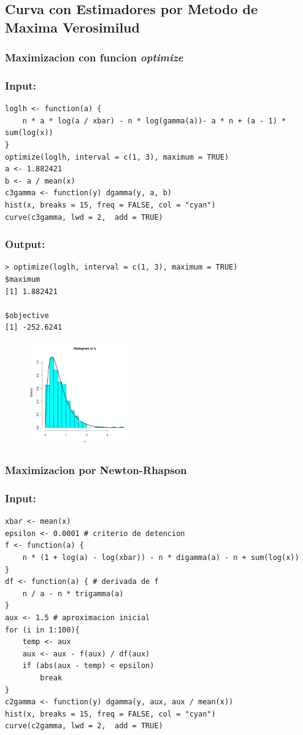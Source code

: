 \documentclass{article}
\begin{document}
    \subsection{Curva con Estimadores por Metodo de Maxima Verosimilud}
    \subsubsection{Maximizacion con funcion \textit{optimize}}
    \subsubsection*{Input:}
    \begin{verbatim}
loglh <- function(a) {
    n * a * log(a / xbar) - n * log(gamma(a))- a * n + (a - 1) * sum(log(x))
}
optimize(loglh, interval = c(1, 3), maximum = TRUE)
a <- 1.882421
b <- a / mean(x)
c3gamma <- function(y) dgamma(y, a, b)
hist(x, breaks = 15, freq = FALSE, col = "cyan")
curve(c3gamma, lwd = 2,  add = TRUE)\end{verbatim}
    \subsubsection*{Output:}
    \begin{verbatim}
> optimize(loglh, interval = c(1, 3), maximum = TRUE)
$maximum
[1] 1.882421

$objective
[1] -252.6241\end{verbatim}
    \begin{figure}[ht]
    \centering
        \includegraphics[width = 0.4\textwidth]{optim.png}
    \end{figure}
    \subsubsection{Maximizacion por Newton-Rhapson}
    \subsubsection*{Input:}
    \begin{verbatim}
xbar <- mean(x)
epsilon <- 0.0001 # criterio de detencion
f <- function(a) {
    n * (1 + log(a) - log(xbar)) - n * digamma(a) - n + sum(log(x))
}
df <- function(a) { # derivada de f
    n / a - n * trigamma(a)
}
aux <- 1.5 # aproximacion inicial
for (i in 1:100){
    temp <- aux
    aux <- aux - f(aux) / df(aux)
    if (abs(aux - temp) < epsilon)
        break
}
c2gamma <- function(y) dgamma(y, aux, aux / mean(x))
hist(x, breaks = 15, freq = FALSE, col = "cyan")
curve(c2gamma, lwd = 2,  add = TRUE)\end{verbatim}
\end{document}
